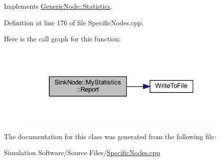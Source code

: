 Implements \hyperlink{class_generic_node_1_1_statistics_ada017fd13bc1b6704d6c7d15ba9ed8df}{Generic\+Node\+::\+Statistics}.



Definition at line 176 of file Specific\+Nodes.\+cpp.

Here is the call graph for this function\+:
\nopagebreak
\begin{figure}[H]
\begin{center}
\leavevmode
\includegraphics[width=301pt]{class_sink_node_1_1_my_statistics_acd304ae3a9892c9de454dc7ee36a942b_cgraph}
\end{center}
\end{figure}


The documentation for this class was generated from the following file\+:\begin{DoxyCompactItemize}
\item 
Simulation Software/\+Source Files/\hyperlink{_specific_nodes_8cpp}{Specific\+Nodes.\+cpp}\end{DoxyCompactItemize}
